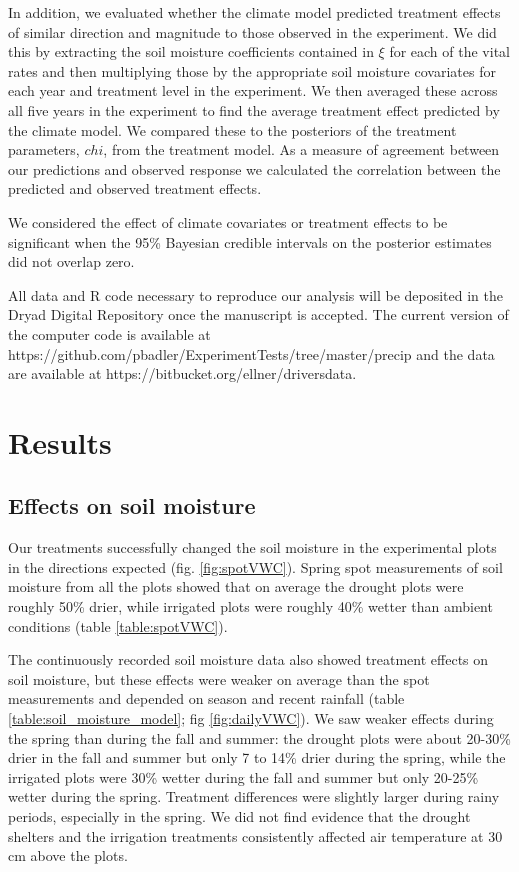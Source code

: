 \documentclass[11pt]{article}
\begin{document}
\begin{doublespacing}
In addition, we evaluated whether the climate model predicted treatment effects of similar direction and magnitude to those observed in the experiment.  We did this by extracting the soil moisture coefficients contained in $\xi$ for each of the vital rates and then multiplying those by the appropriate soil moisture covariates for each year and treatment level in the experiment.  We then averaged these across all five years in the experiment to find the average treatment effect predicted by the climate model.  We compared these to the posteriors of the treatment parameters, $chi$, from the treatment model.  As a measure of agreement between our predictions and observed response we calculated the correlation between the predicted and observed treatment effects. 

We considered the effect of climate covariates or treatment effects to be significant when the 95\% Bayesian credible intervals on the posterior estimates did not overlap zero.  

All data and R code necessary to reproduce our analysis will be deposited in the Dryad Digital Repository once the manuscript is accepted. The current version of the computer code is available at https://github.com/pbadler/ExperimentTests/tree/master/precip and the data are available at https://bitbucket.org/ellner/driversdata. 

\section*{Results}

\subsection*{Effects on soil moisture}

Our treatments successfully changed the soil moisture in the experimental plots in the directions expected (fig. \ref{fig:spotVWC}). Spring spot measurements of soil moisture from all the plots showed that on average the drought plots were roughly 50\% drier, while irrigated plots were roughly 40\% wetter than ambient conditions (table \ref{table:spotVWC}).
  
The continuously recorded soil moisture data also showed treatment effects on soil moisture, but these effects were weaker on average than the spot measurements and depended on season and recent rainfall (table \ref{table:soil_moisture_model}; fig \ref{fig:dailyVWC}). We saw weaker effects during the spring than during the fall and summer: the drought plots were about 20-30\% drier in the fall and summer but only 7 to 14\% drier during the spring, while the irrigated plots were 30\% wetter during the fall and summer but only 20-25\% wetter during the spring.  Treatment differences were slightly larger during rainy periods, especially in the spring. We did not find evidence that the drought shelters and the irrigation treatments consistently affected air temperature at 30 cm above the plots.  


\end{doublespacing}
\end{document}
